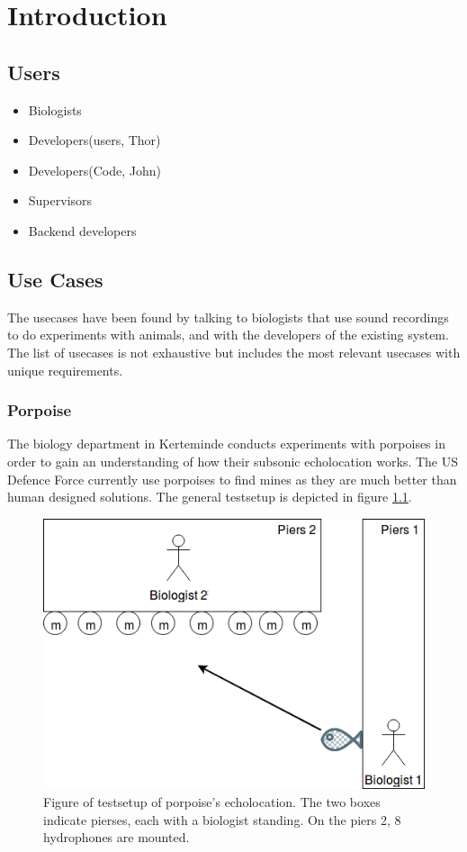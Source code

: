 \chapter{Introduction}


\section{Users}

\begin{itemize}
	\item Biologists
	\item Developers(users, Thor)
	\item Developers(Code, John)
	\item Supervisors
	\item Backend developers
\end{itemize}

\section{Use Cases}
The usecases have been found by talking to biologists that use sound recordings to do experiments with animals, and with the developers of the existing system. The list of usecases is not exhaustive but includes the most relevant usecases with unique requirements.

\subsection{Porpoise}
The biology department in Kerteminde conducts experiments with porpoises in order to gain an understanding of how their subsonic echolocation works. The US Defence Force currently use porpoises to find mines as they are much better than human designed solutions. The general testsetup is depicted in figure \ref{usecase:porpoise_experiment1}.
\begin{figure}[!h]
    \centering
	\includegraphics[width=\textwidth]{figures/porpoise_experiment1}
	\caption{Figure of testsetup of porpoise's echolocation. The two boxes indicate pierses, each with a biologist standing. On the piers 2, 8 hydrophones are mounted.}\label{usecase:porpoise_experiment1}
\end{figure}


